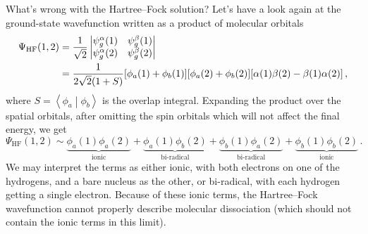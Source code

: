 \documentclass{article}
\theoremstyle{plain}\theoremheaderfont{\normalfont\itshape}\theorembodyfont{\rmfamily}\theoremseparator{.}\newtheorem*{rem}{Remark}\newtheorem*{ex}{Example}\newtheorem*{proof}{Proof}\newtheorem*{altp}{Alternative proof}
\theoremstyle{plain}\theoremheaderfont{\normalfont\bfseries}\theorembodyfont{\rmfamily}\theoremseparator{.}\newtheorem{thm}{Theorem}[section]\newtheorem{lem}[thm]{Lemma}\newtheorem{prop}[thm]{Proposition}\newtheorem*{cor}{Corollary}\newtheorem{defn}[thm]{Definition}\newtheorem{clm}[thm]{Claim}\newtheorem{clminproof}{Claim}\newtheorem{pos}{Postulate}[section]
\theoremstyle{break}\theoremheaderfont{\normalfont\itshape}\theorembodyfont{\rmfamily}\theoremseparator{.\medskip}\newtheorem*{proofskip}{Proof}\newtheorem*{exs}{Examples}\newtheorem*{rems}{Remarks}
\theoremstyle{break}\theoremheaderfont{\normalfont\bfseries}\theorembodyfont{\rmfamily}\theoremseparator{.\medskip}\newtheorem{lemskip}[thm]{Lemma}\newtheorem{defnskip}[thm]{Definition}\newtheorem{propskip}[thm]{Proposition}\newtheorem{thmskip}[thm]{Theorem}
\numberwithin{equation}{section}
\newcommand{\braket}[2]{\left\langle #1 \middle| #2 \right\rangle}
\begin{document}
    What's wrong with the Hartree--Fock solution? Let's have a look again at the ground-state wavefunction written as a product of molecular orbitals
    \begin{align}
        \Psi_{\text{HF}}(1,2)&=\frac{1}{\sqrt{2}}\begin{vmatrix}
            \psi_g^\alpha(1) & \psi_g^\beta(1) \\
            \psi_g^\alpha(2) & \psi_g^\beta(2)
        \end{vmatrix}\notag\\
        &=\frac{1}{2\sqrt{2}(1+S)}[\phi_a(1)+\phi_b(1)][\phi_a(2)+\phi_b(2)][\alpha(1)\beta(2)-\beta(1)\alpha(2)]\,,
    \end{align}
    where \(S=\braket{\phi_a}{\phi_b}\) is the overlap integral. Expanding the product over the spatial orbitals, after omitting the spin orbitals which will not affect the final energy, we get
    \begin{equation}\label{H2_HF_expand}
        \Psi_{\text{HF}}(1,2)\sim\underbrace{\phi_a(1)\phi_a(2)}_{\text{ionic}}+\underbrace{\phi_a(1)\phi_b(2)}_{\text{bi-radical}}+\underbrace{\phi_b(1)\phi_a(2)}_{\text{bi-radical}}+\underbrace{\phi_b(1)\phi_b(2)}_{\text{ionic}}\,.
    \end{equation}
    We may interpret the terms as either ionic, with both electrons on one of the hydrogens, and a bare nucleus as the other, or bi-radical, with each hydrogen getting a single electron. Because of these ionic terms, the Hartree--Fock wavefunction cannot properly describe molecular dissociation (which should not contain the ionic terms in this limit).
\end{document}
